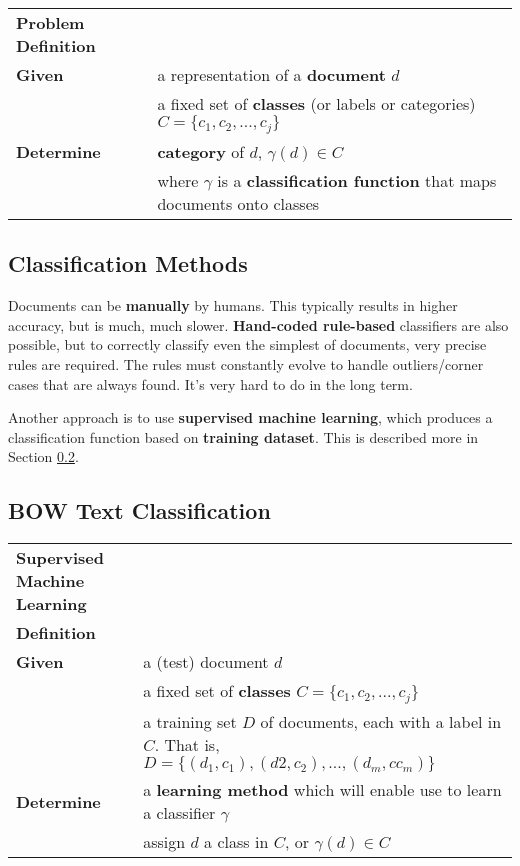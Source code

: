 \documentclass{article}
\begin{document}
\begin{tabular}{ll}
\textbf{Problem Definition} \\
\textbf{Given} & a representation of a \textbf{document} $d$ \\
& a fixed set of \textbf{classes} (or labels or categories) $C = \lbrace c_1, c_2, ..., c_j \rbrace$ \\
\textbf{Determine} & \textbf{category} of $d$, $\gamma(d) \in C$ \\
& where $\gamma$ is a \textbf{classification function} that maps documents onto classes \\
\end{tabular}

\subsection{Classification Methods}

Documents can be \textbf{manually} by humans. This typically results in higher accuracy, but is much, much slower. \textbf{Hand-coded rule-based} classifiers are also possible, but to correctly classify even the simplest of documents, very precise rules are required. The rules must constantly evolve to handle outliers/corner cases that are always found. It's very hard to do in the long term.

Another approach is to use \textbf{supervised machine learning}, which produces a classification function based on \textbf{training dataset}. This is described more in Section \ref{sec:bow-text-classification}.

\subsection{BOW Text Classification}
\label{sec:bow-text-classification}

\begin{tabular}{p{7cm}p{10cm}}
\textbf{Supervised Machine Learning} \\
\textbf{Definition} \\
\textbf{Given} & a (test) document $d$ \\
	& a fixed set of \textbf{classes} $C = \lbrace c_1, c_2, ..., c_j \rbrace$ \\
	& a training set $D$ of documents, each with a label in $C$. That is, $D = \lbrace (d_1, c_1), (d2, c_2), ..., (d_m,c c_m) \rbrace$ \\
\textbf{Determine} & a \textbf{learning method} which will enable use to learn a classifier $\gamma$ \\
	& assign $d$ a class in $C$, or $\gamma(d) \in C$
\end{tabular}
\end{document}
